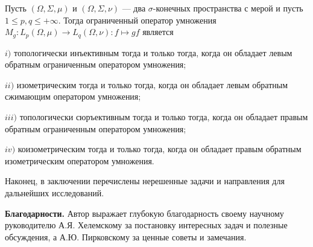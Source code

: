 \begin{theorem*}[\ref{TopInjMultOpDescBtwnTwoMeasSp}, \ref{IsomMultOpDescBtwnTwoMeasSp}, \ref{TopSurMultOpCharacBtwnTwoMeasSp}, \ref{CoisomMultOpDescBtwnTwoMeasSp}] Пусть $(\Omega,\Sigma,\mu)$ и $(\Omega,\Sigma,\nu)$ --- два $\sigma$-конечных пространства с мерой и пусть $1\leq p, q\leq+\infty$. Тогда ограниченный оператор умножения $M_g:L_p(\Omega,\mu)\to L_q(\Omega,\nu):f\mapsto gf$ является

$i)$ топологически инъективным тогда и только тогда, когда он обладает левым обратным ограниченным оператором умножения;

$ii)$ изометрическим тогда и только тогда, когда он обладает левым обратным сжимающим оператором умножения;

$iii)$ топологически сюръективным тогда и только тогда, когда он обладает правым обратным ограниченным оператором умножения;

$iv)$ коизометрическим тогда и только тогда, когда он обладает правым обратным изометрическим оператором умножения.
\end{theorem*}

Наконец, в заключении перечислены нерешенные задачи и направления для дальнейших исследований.

\textbf{Благодарности.} Автор выражает глубокую благодарность своему научному руководителю А.Я. Хелемскому за постановку интересных задач и полезные обсуждения, а А.Ю. Пирковскому за ценные советы и замечания.
\clearpage